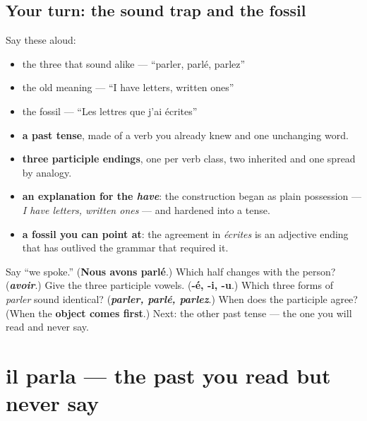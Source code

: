 \subsection*{Your turn: the sound trap and the fossil}
Say these aloud:

\begin{itemize}
\raggedright
  \item the three that sound alike — \textquotedblleft{}parler, parlé, parlez\textquotedblright{}
  \item the old meaning — \textquotedblleft{}I have letters, written ones\textquotedblright{}
  \item the fossil — \textquotedblleft{}Les lettres que j'ai écrites\textquotedblright{}
\end{itemize}

\begin{grammarlens}[title={What you've built so far}]
\begin{itemize}
\raggedright
  \item \textbf{a past tense}, made of a verb you already knew and one unchanging word.
  \item \textbf{three participle endings}, one per verb class, two inherited and one spread by analogy.
  \item \textbf{an explanation for the \emph{have}}: the construction began as plain possession — \emph{I have letters, written ones} — and hardened into a tense.
  \item \textbf{a fossil you can point at}: the agreement in \emph{écrites} is an adjective ending that has outlived the grammar that required it.
\end{itemize}
\end{grammarlens}

\begin{tcolorbox}[breakable,colback=teal!4,colframe=teal!35!black,title={Before you move on}]
Say \textquotedblleft{}we spoke.\textquotedblright{} (\textbf{Nous avons parlé}.) Which half changes with the person? (\emph{\textbf{avoir}}.) Give the three participle vowels. (\textbf{-é, -i, -u}.) Which three forms of \emph{parler} sound identical? (\emph{\textbf{parler, parlé, parlez}}.) When does the participle agree? (When the \textbf{object comes first}.) Next: the other past tense — the one you will read and never say.
\end{tcolorbox}
\section[il parla]{il parla — the past you read but never say}

